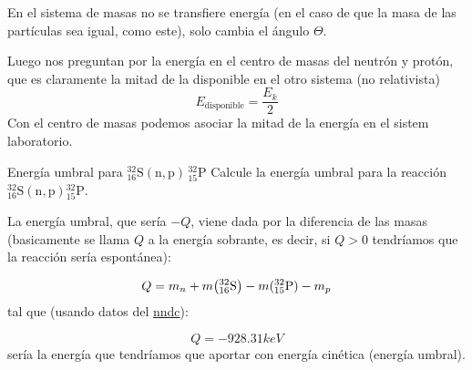 En el sistema de masas no se transfiere energía (en el caso de que la masa de las partículas sea igual, como este), solo cambia el ángulo $\Theta$. 

Luego nos preguntan por la energía en el centro de masas del neutrón y protón, que es claramente la  mitad de la disponible en el otro sistema (no relativista)
\begin{equation}
    E_{\text{disponible}} = \frac{E_k}{2}
\end{equation}
Con el centro de masas podemos asociar la mitad de la energía en el sistem laboratorio.



\begin{Ejercicio}{Energía umbral para $^{32}_{16}\mathrm{S}(\mathrm{n},\mathrm{p})\,^{32}_{15}\mathrm{P}$}\label{Ej:09}
Calcule la energía umbral para la reacción ${}^{32}_{16}\mathrm{S}(\mathrm{n},\mathrm{p}){}^{32}_{15}\mathrm{P}$.
\end{Ejercicio}


La energía umbral, que sería $-Q$, viene dada por la diferencia de las masas (basicamente se llama $Q$ a la energía sobrante, es decir, si $Q>0$ tendríamos que la reacción sería espontánea):

\begin{equation}
    Q =m_n + m \pqty{^{32}_{16}\text{S}} -  m(^{32}_{15}\text{P}) - m_p  
\end{equation}
tal que (usando datos del \href{https://www.nndc.bnl.gov/nudat3/}{nndc}):

\begin{equation}
    Q = - 928.31 \unit{keV}
\end{equation}
sería la energía que tendríamos que aportar con energía cinética (energía umbral).


